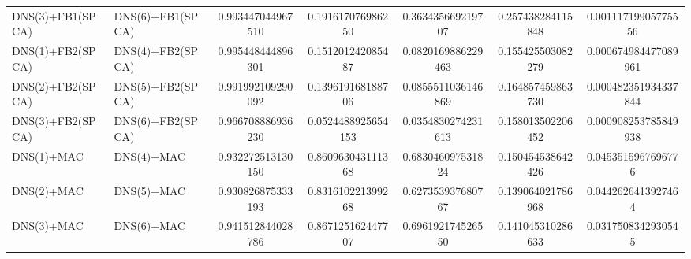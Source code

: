 \begin{table}[H]
\begin{tabular}{llSSSSS}
DNS(3)+FB1(SPCA) & DNS(6)+FB1(SPCA) & 0.993447044967510 & 0.191617076986250 & 0.363435669219707 & 0.257438284115848 & 0.00111719905775556 \\ 
DNS(1)+FB2(SPCA) & DNS(4)+FB2(SPCA) & 0.995448444896301 & 0.151201242085487 & 0.0820169886229463 & 0.155425503082279 & 0.000674984477089961 \\ 
DNS(2)+FB2(SPCA) & DNS(5)+FB2(SPCA) & 0.991992109290092 & 0.139619168188706 & 0.0855511036146869 & 0.164857459863730 & 0.000482351934337844 \\ 
DNS(3)+FB2(SPCA) & DNS(6)+FB2(SPCA) & 0.966708886936230 & 0.0524488925654153 & 0.0354830274231613 & 0.158013502206452 & 0.000908253785849938 \\ 
DNS(1)+MAC & DNS(4)+MAC & 0.932272513130150 & 0.860963043111368 & 0.683046097531824 & 0.150454538642426 & 0.0453515967696776 \\ 
DNS(2)+MAC & DNS(5)+MAC & 0.930826875333193 & 0.831610221399268 & 0.627353937680767 & 0.139064021786968 & 0.0442626413927464 \\ 
DNS(3)+MAC & DNS(6)+MAC & 0.941512844028786 & 0.867125162447707 & 0.696192174526550 & 0.141045310286633 & 0.0317508342930545 \\ \bottomrule 
\end{tabular}
\end{table}


